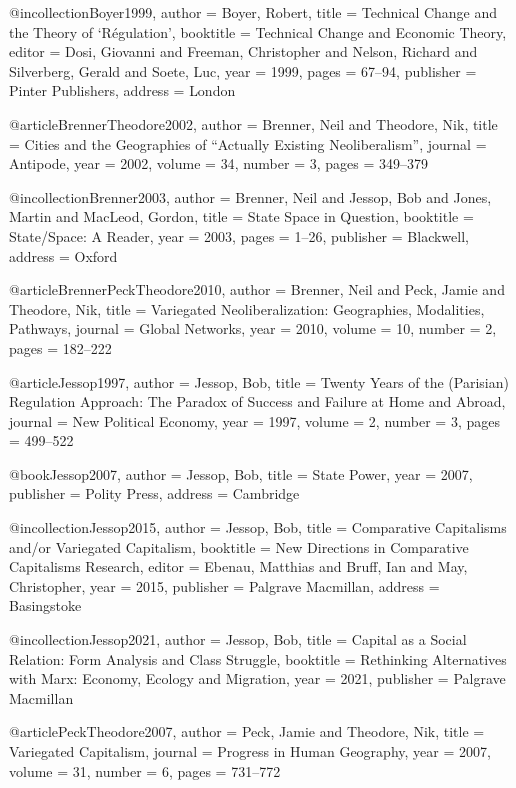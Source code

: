 @incollection{Boyer1999,
	author    = {Boyer, Robert},
	title     = {Technical Change and the Theory of `{R}\'egulation'},
	booktitle = {Technical Change and Economic Theory},
	editor    = {Dosi, Giovanni and Freeman, Christopher and Nelson, Richard and Silverberg, Gerald and Soete, Luc},
	year      = {1999},
	pages     = {67--94},
	publisher = {Pinter Publishers},
	address   = {London}
}

@article{BrennerTheodore2002,
	author  = {Brenner, Neil and Theodore, Nik},
	title   = {Cities and the Geographies of ``Actually Existing Neoliberalism''},
	journal = {Antipode},
	year    = {2002},
	volume  = {34},
	number  = {3},
	pages   = {349--379}
}

@incollection{Brenner2003,
	author    = {Brenner, Neil and Jessop, Bob and Jones, Martin and MacLeod, Gordon},
	title     = {State Space in Question},
	booktitle = {State/Space: A Reader},
	year      = {2003},
	pages     = {1--26},
	publisher = {Blackwell},
	address   = {Oxford}
}

@article{BrennerPeckTheodore2010,
	author  = {Brenner, Neil and Peck, Jamie and Theodore, Nik},
	title   = {Variegated Neoliberalization: Geographies, Modalities, Pathways},
	journal = {Global Networks},
	year    = {2010},
	volume  = {10},
	number  = {2},
	pages   = {182--222}
}

@article{Jessop1997,
	author  = {Jessop, Bob},
	title   = {Twenty Years of the (Parisian) Regulation Approach: The Paradox of Success and Failure at Home and Abroad},
	journal = {New Political Economy},
	year    = {1997},
	volume  = {2},
	number  = {3},
	pages   = {499--522}
}

@book{Jessop2007,
	author    = {Jessop, Bob},
	title     = {State Power},
	year      = {2007},
	publisher = {Polity Press},
	address   = {Cambridge}
}

@incollection{Jessop2015,
	author    = {Jessop, Bob},
	title     = {Comparative Capitalisms and/or Variegated Capitalism},
	booktitle = {New Directions in Comparative Capitalisms Research},
	editor    = {Ebenau, Matthias and Bruff, Ian and May, Christopher},
	year      = {2015},
	publisher = {Palgrave Macmillan},
	address   = {Basingstoke}
}

@incollection{Jessop2021,
	author    = {Jessop, Bob},
	title     = {Capital as a Social Relation: Form Analysis and Class Struggle},
	booktitle = {Rethinking Alternatives with Marx: Economy, Ecology and Migration},
	year      = {2021},
	publisher = {Palgrave Macmillan}
}

@article{PeckTheodore2007,
	author  = {Peck, Jamie and Theodore, Nik},
	title   = {Variegated Capitalism},
	journal = {Progress in Human Geography},
	year    = {2007},
	volume  = {31},
	number  = {6},
	pages   = {731--772}
}

